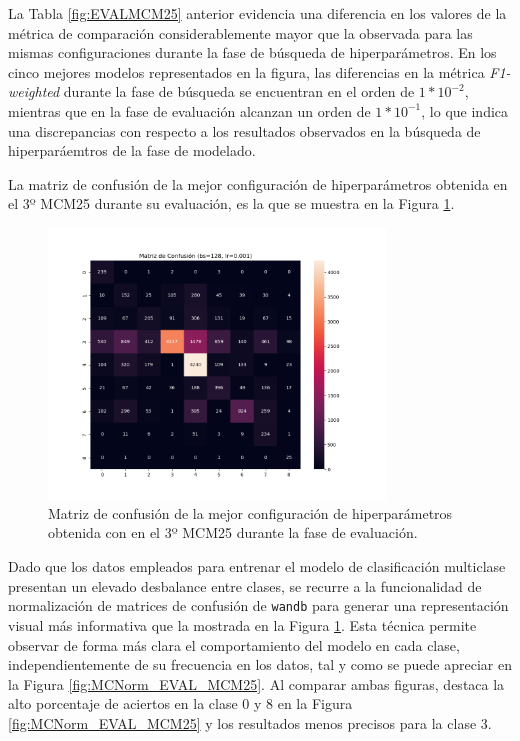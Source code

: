 La Tabla \ref{fig:EVALMCM25} anterior evidencia una diferencia en los valores de la métrica de comparación considerablemente mayor que la observada para las mismas configuraciones durante la fase de búsqueda de hiperparámetros. En los cinco mejores modelos representados en la figura, las diferencias en la métrica \textit{F1-weighted} durante la fase de búsqueda se encuentran en el orden de $1*10^{-2}$, mientras que en la fase de evaluación alcanzan un orden de $1*10^{-1}$, lo que indica una discrepancias con respecto a los resultados observados en la búsqueda de hiperparáemtros de la fase de modelado.

La matriz de confusión de la mejor configuración de hiperparámetros obtenida en el 3º MCM25 durante su evaluación, es la que se muestra en la Figura \ref{fig:MC_EVAL_MCM25}.

\begin{figure}[H]
    \centering
    \includegraphics[width=0.8\textwidth]{./img/evaluacion/matrices_confusion/MC_EVAL_MCM25.png}
    \caption{Matriz de confusión de la mejor configuración de hiperparámetros obtenida con en el 3º MCM25 durante la fase de evaluación.}
    \label{fig:MC_EVAL_MCM25}
\end{figure}

Dado que los datos empleados para entrenar el modelo de clasificación multiclase presentan un elevado desbalance entre clases, se recurre a la funcionalidad de normalización de matrices de confusión de \texttt{wandb} para generar una representación visual más informativa que la mostrada en la Figura \ref{fig:MC_EVAL_MCM25}. Esta técnica permite observar de forma más clara el comportamiento del modelo en cada clase, independientemente de su frecuencia en los datos, tal y como se puede apreciar en la Figura \ref{fig:MCNorm_EVAL_MCM25}. Al comparar ambas figuras, destaca la alto porcentaje de aciertos en la clase 0 y 8 en la Figura \ref{fig:MCNorm_EVAL_MCM25} y los resultados menos precisos para la clase 3.

